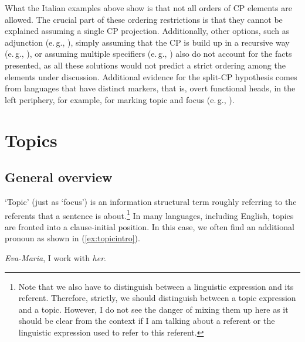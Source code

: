 What the Italian examples above show is that not all orders of CP elements are allowed. The crucial part of these ordering restrictions is that they cannot be explained assuming a single CP projection. Additionally, other options, such as adjunction (e.\,g., \citealt{de2007french}), simply assuming that the CP is build up in a recursive way (e.\,g., \citealt{mccloskey1992adjunction, suner1993indirect}), or assuming multiple specifiers (e.\,g., \citealt{chomsky1995categories}) also do not account for the facts presented, as all these solutions would not predict a strict ordering among the elements under discussion. Additional evidence for the split-CP hypothesis comes from languages that have distinct markers, that is, overt functional heads, in the left periphery, for example, for marking topic and focus (e.\,g., \citealt{aboh2004left}).

\section{Topics}\label{generaltopicsection}

\subsection{General overview}
\label{finersplitstopics}
`Topic' (just as `focus') is an information structural term roughly referring to the referents that a sentence is about.\footnote{ Note that we also have to distinguish between a linguistic expression and its referent. Therefore, strictly, we should distinguish between a topic expression and a topic. However, I do not see the danger of mixing them up here as it should be clear from the context if I am talking about a referent or the linguistic expression used to refer to this referent.} In many languages, including English, topics are fronted into a clause-initial position. In this case, we often find an additional pronoun as shown in (\ref{ex:topicintro}).

\begin{exe}
\ex \textit{Eva-Maria}, I work with \textit{her}. \label{ex:topicintro}
\end{exe} 

